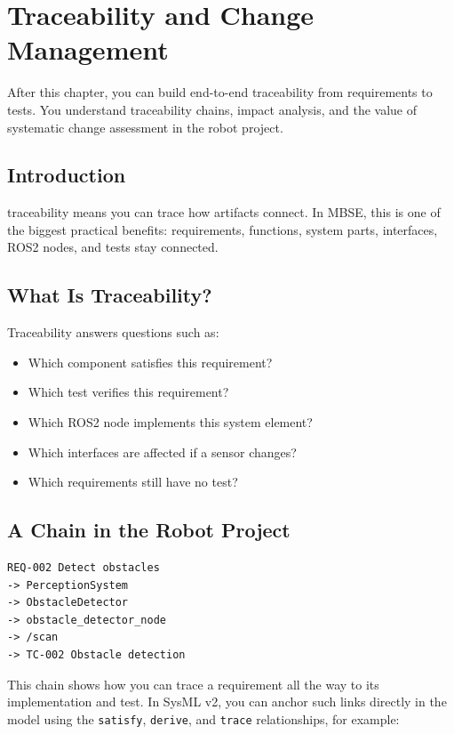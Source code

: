 \chapter{Traceability and Change Management}

\begin{lernziele}
After this chapter, you can build end-to-end traceability from requirements to tests. You understand traceability chains, impact analysis, and the value of systematic change assessment in the robot project.
\end{lernziele}

\section{Introduction}
\gls{traceability} means you can trace how artifacts connect. In MBSE, this is one of the biggest practical benefits: requirements, functions, system parts, interfaces, ROS2 nodes, and tests stay connected.

\section{What Is Traceability?}
Traceability answers questions such as:

\begin{itemize}
    \item Which component satisfies this requirement?
    \item Which test verifies this requirement?
    \item Which ROS2 node implements this system element?
    \item Which interfaces are affected if a sensor changes?
    \item Which requirements still have no test?
\end{itemize}

\section{A Chain in the Robot Project}
\begin{lstlisting}[style=plaintext]
REQ-002 Detect obstacles
-> PerceptionSystem
-> ObstacleDetector
-> obstacle_detector_node
-> /scan
-> TC-002 Obstacle detection
\end{lstlisting}

This chain shows how you can trace a requirement all the way to its implementation and test. In SysML v2, you can anchor such links directly in the model using the \texttt{satisfy}, \texttt{derive}, and \texttt{trace} relationships, for example:

